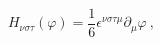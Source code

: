 \begin{equation}
H_{\nu \sigma \tau }(\varphi )=\frac{1}{6}\epsilon ^{\nu \sigma \tau \mu
}\partial _{\mu }\varphi \ ,  \label{HVARPHI}
\end{equation}%
